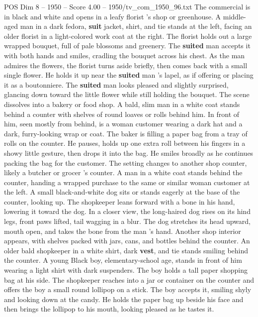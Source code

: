 \begin{textsample}{POS Dim 8 – 1950 – Score 4.00 – 1950/tv\_com\_1950\_96.txt}  \label{ex:f8_pos_078}
The commercial is in black and white and opens in a leafy florist ’s shop or greenhouse.
A middle-aged man in a dark fedora, \textbf{suit} jacket, shirt, and tie stands at the left, facing an older florist in a light-colored work coat at the right.
The florist holds out a large wrapped bouquet, full of pale blossoms and greenery.
The \textbf{suited} man accepts it with both hands and smiles, cradling the bouquet across his chest.
As the man admires the flowers, the florist turns aside briefly, then comes back with a small single flower.
He holds it up near the \textbf{suited} man ’s lapel, as if offering or placing it as a boutonniere.
The \textbf{suited} man looks pleased and slightly surprised, glancing down toward the little flower while still holding the bouquet.
The scene dissolves into a bakery or food shop.
A bald, slim man in a white coat stands behind a counter with shelves of round loaves or rolls behind him.
In front of him, seen mostly from behind, is a woman customer wearing a dark hat and a dark, furry-looking wrap or coat.
The baker is filling a paper bag from a tray of rolls on the counter.
He pauses, holds up one extra roll between his fingers in a showy little gesture, then drops it into the bag.
He smiles broadly as he continues packing the bag for the customer.
The setting changes to another shop counter, likely a butcher or grocer ’s counter.
A man in a white coat stands behind the counter, handing a wrapped purchase to the same or similar woman customer at the left.
A small black-and-white dog sits or stands eagerly at the base of the counter, looking up.
The shopkeeper leans forward with a bone in his hand, lowering it toward the dog.
In a closer view, the long-haired dog rises on its hind legs, front paws lifted, tail wagging in a blur.
The dog stretches its head upward, mouth open, and takes the bone from the man ’s hand.
Another shop interior appears, with shelves packed with jars, cans, and bottles behind the counter.
An older bald shopkeeper in a white shirt, dark \textbf{vest}, and tie stands smiling behind the counter.
A young Black boy, elementary-school age, stands in front of him wearing a light shirt with dark suspenders.
The boy holds a tall paper shopping bag at his side.
The shopkeeper reaches into a jar or container on the counter and offers the boy a small round lollipop on a stick.
The boy accepts it, smiling shyly and looking down at the candy.
He holds the paper bag up beside his face and then brings the lollipop to his mouth, looking pleased as he tastes it.

\end{textsample}

